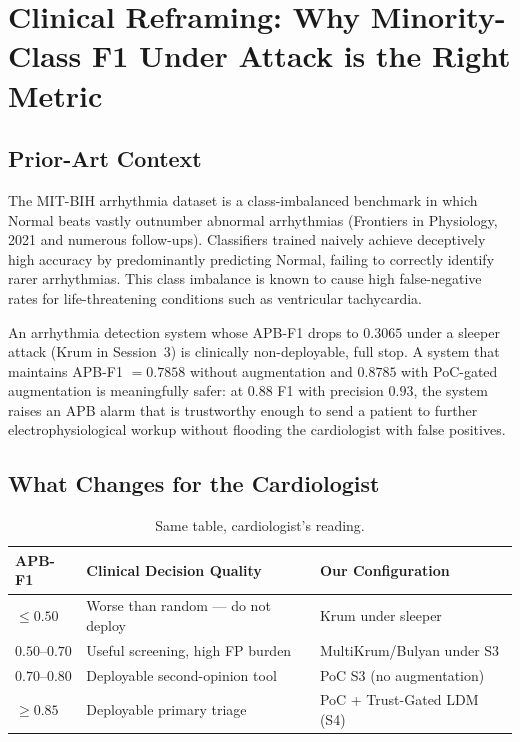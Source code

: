 \documentclass[11pt,a4paper]{article}
\begin{document}
\section{Clinical Reframing: Why Minority-Class F1 Under Attack is the Right Metric}
\label{sec:clinical}

\subsection{Prior-Art Context}

The MIT-BIH arrhythmia dataset is a class-imbalanced benchmark in which
Normal beats vastly outnumber abnormal arrhythmias (Frontiers in
Physiology, 2021 and numerous follow-ups). Classifiers trained naively
achieve deceptively high accuracy by predominantly predicting Normal,
failing to correctly identify rarer arrhythmias. This class imbalance is
known to cause high false-negative rates for life-threatening conditions
such as ventricular tachycardia.

An arrhythmia detection system whose APB-F1 drops to $0.3065$ under a
sleeper attack (Krum in Session~3) is clinically non-deployable, full
stop. A system that maintains APB-F1 $= 0.7858$ without augmentation and
$0.8785$ with PoC-gated augmentation is meaningfully safer: at $0.88$
F1 with precision $0.93$, the system raises an APB alarm that is
trustworthy enough to send a patient to further electrophysiological
workup without flooding the cardiologist with false positives.

\subsection{What Changes for the Cardiologist}

\begin{table}[H]
\centering
\caption{Same table, cardiologist's reading.}
\label{tab:cardio}
\begin{tabular}{@{}l l l@{}}
\toprule
\textbf{APB-F1} & \textbf{Clinical Decision Quality} & \textbf{Our Configuration} \\
\midrule
$\leq 0.50$ & Worse than random --- do not deploy & Krum under sleeper \\
$0.50$--$0.70$ & Useful screening, high FP burden & MultiKrum/Bulyan under S3 \\
$0.70$--$0.80$ & Deployable second-opinion tool & PoC S3 (no augmentation) \\
$\geq 0.85$ & Deployable primary triage & PoC + Trust-Gated LDM (S4) \\
\bottomrule
\end{tabular}
\end{table}
\end{document}
